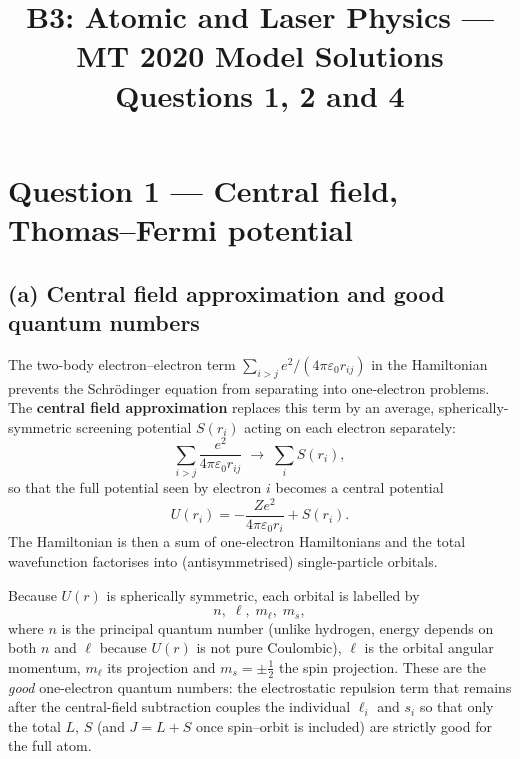 \documentclass[11pt]{article}
\title{B3: Atomic and Laser Physics --- MT 2020 Model Solutions \\ Questions 1, 2 and 4}
\author{}
\date{}
\begin{document}
\maketitle

\section*{Question 1 --- Central field, Thomas--Fermi potential}

\subsection*{(a) Central field approximation and good quantum numbers}

The two-body electron--electron term $\sum_{i>j} e^2/(4\pi\varepsilon_0 r_{ij})$ in the Hamiltonian prevents the Schr\"odinger equation from separating into one-electron problems. The \textbf{central field approximation} replaces this term by an average, spherically-symmetric screening potential $S(r_i)$ acting on each electron separately:
\begin{equation*}
    \sum_{i>j}\frac{e^2}{4\pi\varepsilon_0 r_{ij}} \;\longrightarrow\; \sum_i S(r_i),
\end{equation*}
so that the full potential seen by electron $i$ becomes a central potential
\begin{equation*}
    U(r_i) = -\frac{Ze^2}{4\pi\varepsilon_0 r_i} + S(r_i).
\end{equation*}
The Hamiltonian is then a sum of one-electron Hamiltonians and the total wavefunction factorises into (antisymmetrised) single-particle orbitals.

Because $U(r)$ is spherically symmetric, each orbital is labelled by
\begin{equation*}
    n,\; \ell,\; m_\ell,\; m_s,
\end{equation*}
where $n$ is the principal quantum number (unlike hydrogen, energy depends on both $n$ and $\ell$ because $U(r)$ is not pure Coulombic), $\ell$ is the orbital angular momentum, $m_\ell$ its projection and $m_s=\pm\tfrac12$ the spin projection. These are the \emph{good} one-electron quantum numbers: the electrostatic repulsion term that remains after the central-field subtraction couples the individual $\ell_i$ and $s_i$ so that only the total $L$, $S$ (and $J=L+S$ once spin--orbit is included) are strictly good for the full atom.
\end{document}
